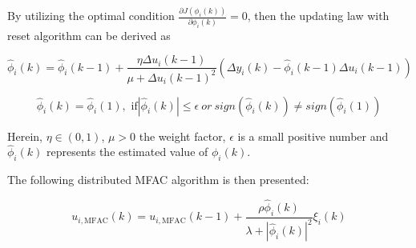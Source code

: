 \documentclass[journal,onecolumn]{IEEEtran}
\begin{document}
By utilizing the optimal condition $ \frac{\partial J(\phi_i(k))}{\partial \phi_i(k)}=0 $, then the updating law with reset algorithm can be derived as










\begin{equation}
    \label{model eq:ppd_parameter}
    \hat{\phi}_i(k) = \hat{\phi}_i(k-1) + \frac{\eta \Delta u_i(k-1) }{\mu + \Delta u_i(k-1)^2}(\Delta y_i(k) - \hat{\phi}_i(k-1) \Delta u_i(k-1))
\end{equation}

\begin{equation}
    \label{reset}
    \hat{\phi}_i(k) = \hat{\phi}_i(1),  \text{    if}  |\hat{\phi}_i(k) | \leq \epsilon \ or \ sign(\hat{\phi}_i(k)) \neq  sign(\hat{\phi}_i(1))
\end{equation}

Herein, $\eta \in (0,1) $, $\mu > 0$ the weight factor, $ \epsilon $ is a small positive number  and $ \hat{\phi}_i(k)$ represents the estimated value of $ \phi_i(k)$. 



The following distributed MFAC algorithm is then presented:



\begin{equation}
    \label{model eq:mfac}
    u_{i,\text{MFAC}}(k) = u_{i,\text{MFAC}}(k - 1) + \frac{\rho \hat{\phi}_i(k)}{\lambda + |\hat{\phi}_i(k)|^2} \xi_i(k)
\end{equation}
\end{document}
